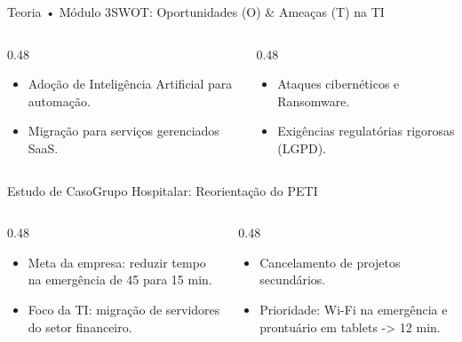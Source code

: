 \begin{senaiframe}{Teoria • Módulo 3}{SWOT: Oportunidades (O) \& Ameaças (T) na TI}
  \begin{columns}[t]
    \begin{column}{0.48\textwidth}
      \begin{tcolorbox}[senaibluecard, title={Exemplos de Oportunidades (O)}]
        \begin{itemize}
          \item Adoção de Inteligência Artificial para automação.
          \item Migração para serviços gerenciados SaaS.
        \end{itemize}
      \end{tcolorbox}
    \end{column}
    \begin{column}{0.48\textwidth}
      \begin{tcolorbox}[senaiambercard, title={Exemplos de Ameaças (T)}]
        \begin{itemize}
          \item Ataques cibernéticos e Ransomware.
          \item Exigências regulatórias rigorosas (LGPD).
        \end{itemize}
      \end{tcolorbox}
    \end{column}
  \end{columns}
\end{senaiframe}

\begin{senaiframe}{Estudo de Caso}{Grupo Hospitalar: Reorientação do PETI}
  \begin{columns}[t]
    \begin{column}{0.48\textwidth}
      \begin{tcolorbox}[senairedcard, title={Desalinhamento Constatado}]
        \begin{itemize}
          \item Meta da empresa: reduzir tempo na emergência de 45 para 15 min.
          \item Foco da TI: migração de servidores do setor financeiro.
        \end{itemize}
      \end{tcolorbox}
    \end{column}
    \begin{column}{0.48\textwidth}
      \begin{tcolorbox}[senaigreencard, title={Solução via PETI}]
        \begin{itemize}
          \item Cancelamento de projetos secundários.
          \item Prioridade: Wi-Fi na emergência e prontuário em tablets -> 12 min.
        \end{itemize}
      \end{tcolorbox}
    \end{column}
  \end{columns}
\end{senaiframe}

